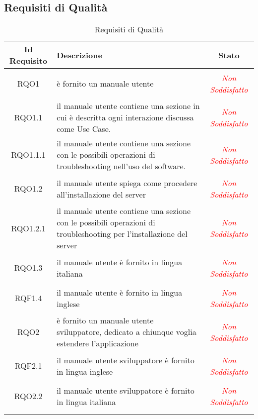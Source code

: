 \subsection{Requisiti di Qualità}
\normalsize
\begin{longtable}{|c|>{\centering}m{7cm}|c|}
\hline 
\textbf{Id Requisito} & \textbf{Descrizione} & \textbf{Stato}\\
\hline
\endhead
\hypertarget{RQO1}{RQO1} & è fornito un manuale utente & \textcolor{red}{\textit{Non Soddisfatto}}\\ \hline

\hypertarget{RQO1.1}{RQO1.1} & il manuale utente contiene una sezione in cui è descritta ogni interazione discussa come Use Case. & \textcolor{red}{\textit{Non Soddisfatto}}\\ \hline

\hypertarget{RQO1.1.1}{RQO1.1.1} & il manuale utente contiene una sezione con le possibili operazioni di troubleshooting nell'uso del software. & \textcolor{red}{\textit{Non Soddisfatto}}\\ \hline

\hypertarget{RQO1.2}{RQO1.2} & il manuale utente spiega come procedere all'installazione del server & \textcolor{red}{\textit{Non Soddisfatto}}\\ \hline

\hypertarget{RQO1.2.1}{RQO1.2.1} & il manuale utente contiene una sezione con le possibili operazioni di troubleshooting per l'installazione del server & \textcolor{red}{\textit{Non Soddisfatto}}\\ \hline

\hypertarget{RQO1.3}{RQO1.3} & il manuale utente è fornito in lingua italiana & \textcolor{red}{\textit{Non Soddisfatto}}\\ \hline

\hypertarget{RQF1.4}{RQF1.4} & il manuale utente è fornito in lingua inglese & \textcolor{red}{\textit{Non Soddisfatto}}\\ \hline

\hypertarget{RQO2}{RQO2} & è fornito un manuale utente sviluppatore, dedicato a chiunque voglia estendere l'applicazione & \textcolor{red}{\textit{Non Soddisfatto}}\\ \hline

\hypertarget{RQF2.1}{RQF2.1} & il manuale utente sviluppatore è fornito in lingua inglese & \textcolor{red}{\textit{Non Soddisfatto}}\\ \hline

\hypertarget{RQO2.2}{RQO2.2} & il manuale utente sviluppatore è fornito in lingua italiana & \textcolor{red}{\textit{Non Soddisfatto}}\\ \hline

\caption[Requisiti di Qualità]{Requisiti di Qualità}
\label{tabella:req2}
\end{longtable}
\clearpage
